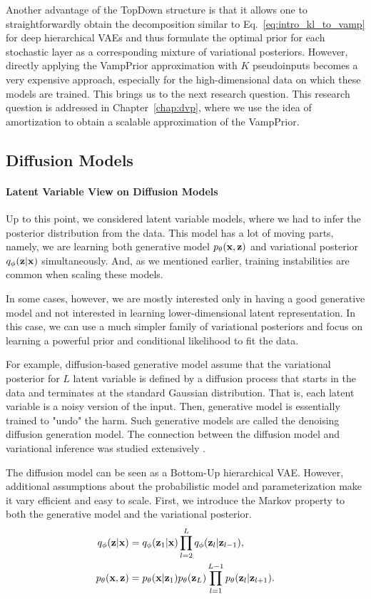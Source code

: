 Another advantage of the TopDown structure is that it allows one to straightforwardly obtain the decomposition similar to Eq.~\ref{eq:intro_kl_to_vamp} for deep hierarchical VAEs and thus formulate the optimal prior for each stochastic layer as a corresponding mixture of variational posteriors. 
However, directly applying the VampPrior approximation with $K$ pseudoinputs becomes a very expensive approach, especially for the high-dimensional data on which these models are trained. This brings us to the next research question.
This research question is addressed in Chapter~\ref{chap:dvp}, where we use the idea of amortization to obtain a scalable approximation of the VampPrior. 

\subsection{Diffusion Models}\label{sec:intro_diffusion}
\paragraph{Latent Variable View on Diffusion Models}
Up to this point, we considered latent variable models, where we had to infer the posterior distribution from the data. This model has a lot of moving parts, namely, we are learning both generative model $p_{\theta}({\mathbf{x}}, {\mathbf{z}})$ and variational posterior $q_{\phi}({\mathbf{z}}|{\mathbf{x}})$ simultaneously.  And, as we mentioned earlier, training instabilities are common when scaling these models. 

In some cases, however, we are mostly interested only in having a good generative model and not interested in learning lower-dimensional latent representation. In this case, we can use a much simpler family of variational posteriors and focus on learning a powerful prior and conditional likelihood to fit the data.  

For example, diffusion-based generative model assume that the variational posterior for $L$ latent variable is defined by a diffusion process that starts in the data and terminates at the standard Gaussian distribution. That is, each latent variable is a noisy version of the input.  Then, generative model is essentially trained to "undo" the harm. Such generative models are called the denoising diffusion generation model. The connection between the diffusion model and variational inference was studied extensively \cite{ho2020denoising, huang2021variational, kingma2021variational, tzen2019neural}.

The diffusion model can be seen as a Bottom-Up hierarchical VAE. However, additional assumptions about the probabilistic model and parameterization make it vary efficient and easy to scale. 
First, we introduce the Markov property to both the generative model and the variational posterior.
\begin{align}
    q_{\phi}({\mathbf{z}}|{\mathbf{x}}) &= q_{\phi}({\mathbf{z}}_1|{\mathbf{x}})\prod_{l=2}^L q_{\phi}({\mathbf{z}}_l|{\mathbf{z}}_{l-1}), \\
    p_{\theta}({\mathbf{x}}, {\mathbf{z}}) &= p_{\theta}({\mathbf{x}} |{\mathbf{z}}_1) p_{\theta}({\mathbf{z}}_L)\prod_{l=1}^{L-1} p_{\theta}({\mathbf{z}}_l|{\mathbf{z}}_{l+1}).
\end{align}

